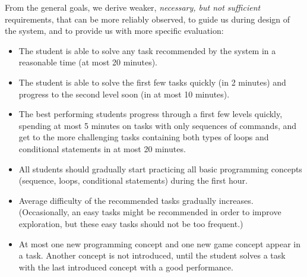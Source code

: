 From the general goals, we derive weaker,
\emph{necessary, but not sufficient} requirements, that can be more reliably observed,
to guide us during design of the system,
and to provide us with more specific evaluation:  %
\begin{itemize}
\item The student is able to solve any task recommended by the system
  in a reasonable time (at most 20 minutes).
\item The student is able to solve the first few tasks quickly
    (in 2 minutes) and progress to the second level soon (in at most 10
    minutes).
\item The best performing students %
progress through a first few levels quickly, spending at most 5 minutes
on tasks with only sequences of commands, and get to the more
challenging tasks containing both types of loops and conditional statements
in at most 20 minutes.  %
\item All students should gradually start practicing all basic programming concepts
  (sequence, loops, conditional statements) during the first hour. %
\item Average difficulty of the recommended tasks gradually increases.
  (Occasionally, an easy tasks might be recommended in order to improve
  exploration, but these easy tasks should not be too frequent.)
\item At most one new programming concept and one new game concept appear
  in a task. Another concept is not introduced, until the student
  solves a task with the last introduced concept with a good
  performance. %
\end{itemize}

